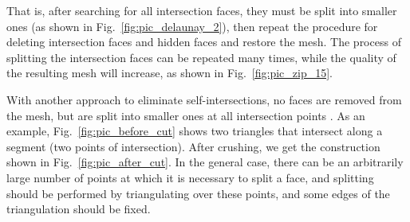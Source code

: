 \documentclass[
11pt,%
tightenlines,%
twoside,%
onecolumn,%
nofloats,%
nobibnotes,%
nofootinbib,%
superscriptaddress,%
noshowpacs,%
centertags]%
{revtex4-2}
\begin{document}
That is, after searching for all intersection faces, they must be split into smaller ones (as shown in Fig.~\ref{fig:pic_delaunay_2}), then repeat the procedure for deleting intersection faces and hidden faces and restore the mesh.
The process of splitting the intersection faces can be repeated many times, while the quality of the resulting mesh will increase, as shown in Fig.~\ref{fig:pic_zip_15}.

With another approach to eliminate self-intersections, no faces are removed from the mesh, but are split into smaller ones at all intersection points \cite{Skvorkovska}.
As an example, Fig.~\ref{fig:pic_before_cut} shows two triangles that intersect along a segment (two points of intersection).
After crushing, we get the construction shown in Fig.~\ref{fig:pic_after_cut}.
In the general case, there can be an arbitrarily large number of points at which it is necessary to split a face, and splitting should be performed by triangulating over these points, and some edges of the triangulation should be fixed.
\end{document}
